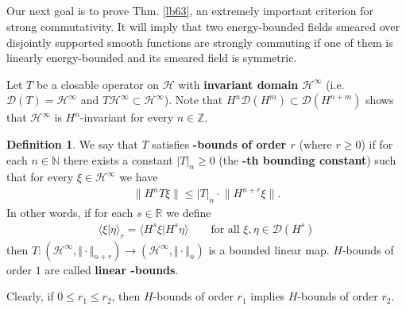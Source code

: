 \documentclass[12pt,b5paper,notitlepage]{article}
\theoremstyle{definition}
\newtheorem{df}{Definition}[section]
\theoremstyle{plain}
\newcommand{\mc}{\mathcal}
\newcommand{\Dom}{\scr{D}}
\newcommand{\bk}[1]{\langle {#1}\rangle}
\newcommand{\scr}{\mathscr}
\newcommand{\Nbb}{\mathbb N}
\newcommand{\Zbb}{\mathbb Z}
\newcommand{\Rbb}{\mathbb R}
\numberwithin{equation}{section}
\begin{document}
\subsection{}


Our next goal is to prove Thm. \ref{lb63}, an extremely important criterion for strong commutativity. It will imply that two energy-bounded fields smeared over disjointly supported smooth functions are strongly commuting if one of them is linearly energy-bounded and its smeared field is symmetric.



Let $T$ be a closable operator on $\mc H$ with \textbf{invariant domain} $\mc H^\infty$ (i.e. $\Dom(T)=\mc H^\infty$ and $T\mc H^\infty\subset\mc H^\infty$). Note that $H^n\Dom(H^m)\subset\Dom(H^{n+m})$ shows that $\mc H^\infty$ is $H^n$-invariant for every $n\in\Zbb$. 

\begin{df}
We say that $T$ satisfies \textbf{-bounds of order $r$} (where $r\geq 0$) if for each $n\in\Nbb$ there exists a constant $|T|_n\geq0$ (the \textbf{-th bounding constant}) such that for every $\xi\in\mc H^\infty$ we have
\begin{align}
\lVert H^nT\xi\lVert\leq |T|_n\cdot \lVert H^{n+r}\xi\lVert.\label{eqa7}	
\end{align}
In other words, if for each $s\in\Rbb$ we define
\begin{align*}
\bk{\xi|\eta}_r=\bk{H^s\xi|H^s\eta}\qquad\text{for all }\xi,\eta\in\Dom(H^s)
\end{align*}
then $T:(\mc H^\infty,\Vert\cdot\Vert_{n+r})\rightarrow (\mc H^\infty,\Vert\cdot\Vert_n)$ is a bounded linear map. $H$-bounds of order $1$ are called \textbf{linear -bounds}.
\end{df}

Clearly, if $0\leq r_1\leq r_2$, then $H$-bounds of order $r_1$ implies $H$-bounds of order $r_2$.
\end{document}
